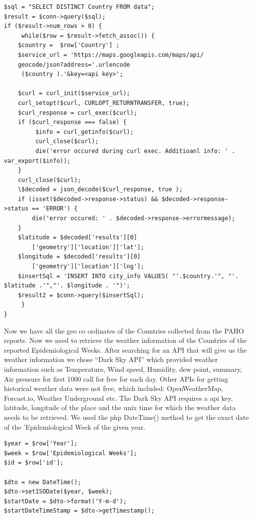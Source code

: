 \documentclass[conference]{IEEEtran}
\begin{document}
\begin{lstlisting}
$sql = "SELECT DISTINCT Country FROM data";
$result = $conn->query($sql);
if ($result->num_rows > 0) {
     while($row = $result->fetch_assoc()) {
	$country =  $row['Country'] ;
	$service_url = 'https://maps.googleapis.com/maps/api/
	geocode/json?address='.urlencode
	 ($country ).'&key=<api key>';

	$curl = curl_init($service_url);
	curl_setopt($curl, CURLOPT_RETURNTRANSFER, true);
	$curl_response = curl_exec($curl);
	if ($curl_response === false) {
   		 $info = curl_getinfo($curl);
   		 curl_close($curl);
   		 die('error occured during curl exec. Additioanl info: ' . var_export($info));
	}
	curl_close($curl);
	\$decoded = json_decode($curl_response, true );
	if (isset($decoded->response->status) && $decoded->response->status == 'ERROR') {
 		die('error occured: ' . $decoded->response->errormessage);
	}
	$latitude = $decoded['results'][0]
		['geometry']['location']['lat'];
	$longitude = $decoded['results'][0]
		['geometry']['location']['lng'];
	$insertSql = 'INSERT INTO city_info VALUES( "'.$country.'", "'. $latitude .'","'. $longitude . '")';
	$result2 = $conn->query($insertSql);
     }
}

\end{lstlisting}


Now we have all the geo co ordinates of the Countries collected from the PAHO reports. 
Now we need to retrieve the weather information of the Countries of the reported Epidemiological Weeks. After searching for an API that will give us the weather information we chose “Dark Sky API” which provided weather information such as Temperature, Wind speed, Humidity, dew point, summary, Air pressure for first 1000 call for free for each day. Other APIs for getting historical weather data were not free, which included: OpenWeatherMap, Forcast.io, Weather Underground etc. 
The Dark Sky API requires a api key, latitude, longitude of the place and the unix time for which the weather data needs to be retrieved. 
We used the php DateTime() method to get the exact date of the 'Epidemiological Week of the given year.

\begin{lstlisting}
$year = $row['Year'];
$week = $row['Epidemiological Weeks'];
$id = $row['id'];

$dto = new DateTime();
$dto->setISODate($year, $week);
$startDate = $dto->format('Y-m-d');
$startDateTimeStamp = $dto->getTimestamp();

\end{lstlisting}
\end{document}
